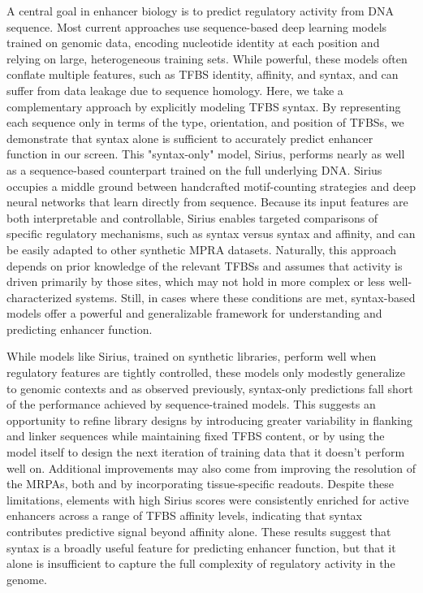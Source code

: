 A central goal in enhancer biology is to predict regulatory activity from DNA sequence. Most current approaches use sequence-based deep learning models trained on genomic data, encoding nucleotide identity at each position and relying on large, heterogeneous training sets. While powerful, these models often conflate multiple features, such as TFBS identity, affinity, and syntax, and can suffer from data leakage due to sequence homology\cite{De_Boer2024-ic,Rafi2025-er}. Here, we take a complementary approach by explicitly modeling TFBS syntax. By representing each sequence only in terms of the type, orientation, and position of TFBSs, we demonstrate that syntax alone is sufficient to accurately predict enhancer function in our screen. This "syntax-only" model, Sirius, performs nearly as well as a sequence-based counterpart trained on the full underlying DNA. Sirius occupies a middle ground between handcrafted motif-counting strategies and deep neural networks that learn directly from sequence. Because its input features are both interpretable and controllable, Sirius enables targeted comparisons of specific regulatory mechanisms, such as syntax versus syntax and affinity, and can be easily adapted to other synthetic MPRA datasets. Naturally, this approach depends on prior knowledge of the relevant TFBSs and assumes that activity is driven primarily by those sites, which may not hold in more complex or less well-characterized systems. Still, in cases where these conditions are met, syntax-based models offer a powerful and generalizable framework for understanding and predicting enhancer function.

While models like Sirius, trained on synthetic libraries, perform well when regulatory features are tightly controlled\cite{King2020-hk,Fromel2024-ux}, these models only modestly generalize to genomic contexts and as observed previously, syntax-only predictions fall short of the performance achieved by sequence-trained models\cite{King2020-hk}. This suggests an opportunity to refine library designs by introducing greater variability in flanking and linker sequences while maintaining fixed TFBS content, or by using the model itself to design the next iteration of training data that it doesn’t perform well on\cite{Friedman2023-yh}. Additional improvements may also come from improving the resolution of the MRPAs, both and by incorporating tissue-specific readouts. Despite these limitations, elements with high Sirius scores were consistently enriched for active enhancers across a range of TFBS affinity levels, indicating that syntax contributes predictive signal beyond affinity alone. These results suggest that syntax is a broadly useful feature for predicting enhancer function, but that it alone is insufficient to capture the full complexity of regulatory activity in the genome.


